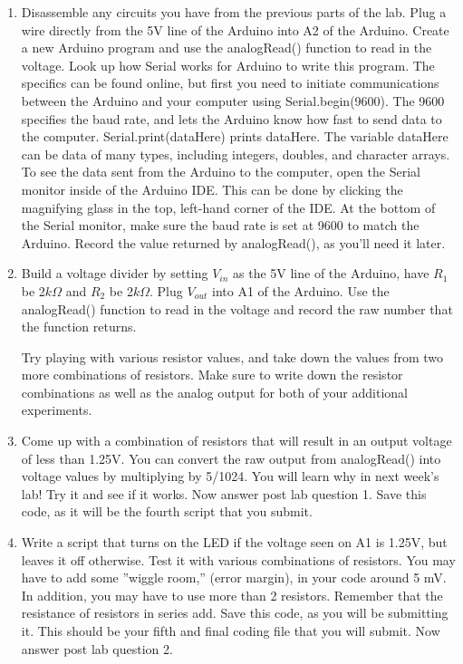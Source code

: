 \documentclass[12pt]{article}
\begin{document}
	\begin{enumerate}
        \item Disassemble any circuits you have from the previous parts of the lab. Plug a wire directly from the 5V line of the Arduino into A2 of the Arduino. Create a new Arduino program and use the analogRead() function to read in the voltage. Look up how Serial works for Arduino to write this program. The specifics can be found online, but first you need to initiate communications between the Arduino and your computer using Serial.begin(9600). The 9600 specifies the baud rate, and lets the Arduino know how fast to send data to the computer. Serial.print(dataHere) prints dataHere. The variable dataHere can be data of many types, including integers, doubles, and character arrays. To see the data sent from the Arduino to the computer, open the Serial monitor inside of the Arduino IDE. This can be done by clicking the magnifying glass in the top, left-hand corner of the IDE. At the bottom of the Serial monitor, make sure the baud rate is set at 9600 to match the Arduino. Record the value returned by analogRead(), as you'll need it later.
        
    	\item Build a voltage divider by setting $V_{in}$ as the 5V line of the Arduino, have $R_1$ be 2$k\Omega$ and $R_2$ be 2$k\Omega$. Plug $V_{out}$ into A1 of the Arduino.  Use the analogRead() function to read in the voltage and record the raw number that the function returns.
    
        Try playing with various resistor values, and take down the values from two more combinations of resistors. Make sure to write down the resistor combinations as well as the analog output for both of your additional experiments.
        
		\item Come up with a combination of resistors that will result in an output voltage of less than 1.25V. You can convert the raw output from analogRead() into voltage values by multiplying by 5/1024. You will learn why in next week's lab! Try it and see if it works. Now answer post lab question 1. Save this code, as it will be the fourth script that you submit.
		
        \item Write a script that turns on the LED if the voltage seen on A1 is 1.25V, but leaves it off otherwise. Test it with various combinations of resistors. You may have to add some ''wiggle room,'' (error margin), in your code around 5 mV. In addition, you may have to use more than 2 resistors. Remember that the resistance of resistors in series add. Save this code, as you will be submitting it. This should be your fifth and final coding file that you will submit. Now answer post lab question 2.
	\end{enumerate}
\end{document}
